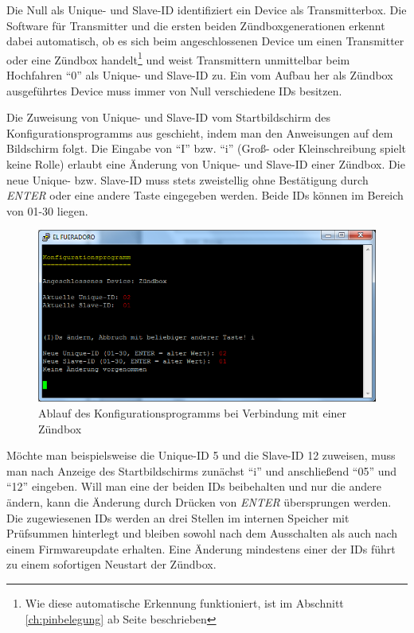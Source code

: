 \documentclass[paper=a4, parskip, numbers=noenddot, toc=listof, headsepline]{scrbook}
\begin{document}
					Die Null als Unique- und Slave-ID identifiziert ein Device als Transmitterbox. Die Software für Transmitter und die ersten beiden Zündboxgenerationen erkennt dabei automatisch, ob es sich beim angeschlossenen Device um einen Transmitter oder eine Zündbox handelt\footnote{Wie diese automatische Erkennung funktioniert, ist im Abschnitt \ref{ch:pinbelegung} ab Seite \pageref{ch:pinbelegung} beschrieben} und weist Transmittern unmittelbar beim Hochfahren \enquote{0} als Unique- und Slave-ID zu. Ein vom Aufbau her als Zündbox ausgeführtes Device muss immer von Null verschiedene IDs besitzen.

					Die Zuweisung von Unique- und Slave-ID vom Startbildschirm des Konfigurationsprogramms aus geschieht, indem man den Anweisungen auf dem Bildschirm folgt. Die Eingabe von \enquote{I} bzw. \enquote{i} (Groß- oder Kleinschreibung spielt keine Rolle) erlaubt eine Änderung von Unique- und Slave-ID einer Zündbox. Die neue Unique- bzw. Slave-ID muss stets zweistellig ohne Bestätigung durch \emph{ENTER} oder eine andere Taste eingegeben werden. Beide IDs können im Bereich von 01-30 liegen.

					\begin{figure}
						\centering
						\includegraphics[width=.8\textwidth]{Bilder/conf}
						\caption{Ablauf des Konfigurationsprogramms bei Verbindung mit einer Zündbox}
						\label{fig:conf}
					\end{figure}

					Möchte man beispielsweise die Unique-ID 5 und die Slave-ID 12 zuweisen, muss man nach Anzeige des Startbildschirms zunächst \enquote{i} und anschließend \enquote{05} und \enquote{12} eingeben. Will man eine der beiden IDs beibehalten und nur die andere ändern, kann die Änderung durch Drücken von \emph{ENTER} übersprungen werden. Die zugewiesenen IDs werden an drei Stellen im internen Speicher mit Prüfsummen hinterlegt und bleiben sowohl nach dem Ausschalten als auch nach einem Firmwareupdate erhalten. Eine Änderung mindestens einer der IDs führt zu einem sofortigen Neustart der Zündbox.
\end{document}
